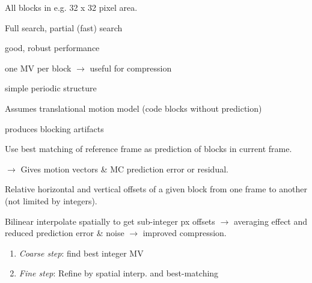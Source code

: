 \begin{definition}
  All blocks in e.g. 32 x 32 pixel area.
\end{definition}

\begin{definition}
  Full search, partial (fast) search
\end{definition}

\begin{definition}[Advantages]
  \begin{itemize*}
    \item good, robust performance
    \item one MV per block \(\to\) useful for compression
    \item simple periodic structure
  \end{itemize*}
\end{definition}

\begin{definition}[Disadvantages]
  \begin{itemize*}
    \item Assumes translational motion model (code blocks without prediction)
    \item produces blocking artifacts
  \end{itemize*}
\end{definition}

\begin{algorithm}
  Use best matching of reference frame as prediction of blocks in current frame.

  \(\to\) Gives motion vectors \& MC prediction error or residual.
\end{algorithm}

\begin{definition}
  Relative horizontal and vertical offsets of a given block from one frame to another (not limited by integers).
\end{definition}

\begin{algorithm}
  Bilinear interpolate spatially to get sub-integer px offsets \(\to\) averaging effect and reduced prediction error \& noise \(\to\) improved compression.
  \begin{enumerate}
    \item \textit{Coarse step}: find best integer MV
    \item \textit{Fine step}: Refine by spatial interp. and best-matching
  \end{enumerate}
\end{algorithm}

